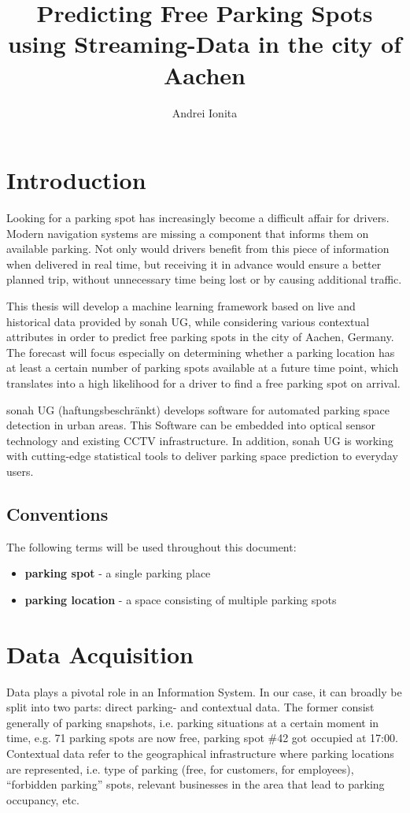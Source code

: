 \documentclass{article}
\begin{document}
\title{Predicting Free Parking Spots using Streaming-Data in the city of Aachen}
\author{Andrei Ionita}

\maketitle

\section{Introduction}
Looking for a parking spot has increasingly become a difficult affair for drivers. Modern navigation systems are missing a component that informs them on available parking. Not only would drivers benefit from this piece of information when delivered in real time, but receiving it in advance would ensure a better planned trip, without unnecessary time being lost or by causing additional traffic.

\vspace{2mm}
This thesis will develop a machine learning framework based on live and historical data provided by sonah UG, while considering various contextual attributes in order to predict free parking spots in the city of Aachen, Germany. The forecast will focus especially on determining whether a parking location has at least a certain number of parking spots available at a future time point, which translates into a high likelihood for a driver to find a free parking spot on arrival.

\vspace{2mm}
sonah UG (haftungsbeschr\"ankt) develops software for automated parking space detection in urban areas. This Software can be embedded into optical sensor technology and existing CCTV infrastructure. In addition, sonah UG is working with cutting-edge statistical tools to deliver parking space prediction to everyday users. 

\subsection{Conventions}
The following terms will be used throughout this document:
\begin{itemize}
\item \textbf{parking spot} - a single parking place
\item \textbf{parking location} - a space consisting of multiple parking spots
\end{itemize}

\section{Data Acquisition}
Data plays a pivotal role in an Information System. In our case, it can broadly be split into two parts: direct parking- and contextual data. The former consist generally of parking snapshots, i.e. parking situations at a certain moment in time, e.g. 71 parking spots are now free, parking spot \#42 got occupied at 17:00. Contextual data refer to the geographical infrastructure where parking locations are represented, i.e. type of parking (free, for customers, for employees), ``forbidden parking'' spots, relevant businesses in the area that lead to parking occupancy, etc.
\end{document}
